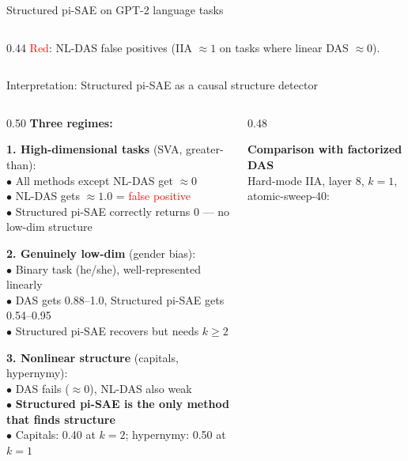 \documentclass[aspectratio=169,11pt]{beamer}
\begin{document}
\begin{frame}{Structured pi-SAE on GPT-2 language tasks}
\begin{columns}[T]
\begin{column}{0.44\textwidth}
\vspace{0.3em}
{\scriptsize \textcolor{red}{Red}: NL-DAS false positives (IIA $\approx 1$ on tasks where linear DAS $\approx 0$).}
\end{column}
\end{columns}
\end{frame}

\begin{frame}{Interpretation: Structured pi-SAE as a causal structure detector}

\begin{columns}[T]
\begin{column}{0.50\textwidth}
\textbf{Three regimes:}

\vspace{0.3em}
{\small \textbf{1. High-dimensional tasks} (SVA, greater-than):}\\
{\small $\bullet$ All methods except NL-DAS get $\approx 0$\\
$\bullet$ NL-DAS gets $\approx 1.0$ = \textcolor{red}{false positive}\\
$\bullet$ Structured pi-SAE correctly returns 0 --- no low-dim structure}

\vspace{0.3em}
{\small \textbf{2. Genuinely low-dim} (gender bias):}\\
{\small $\bullet$ Binary task (he/she), well-represented linearly\\
$\bullet$ DAS gets 0.88--1.0, Structured pi-SAE gets 0.54--0.95\\
$\bullet$ Structured pi-SAE recovers but needs $k \geq 2$}

\vspace{0.3em}
{\small \textbf{3. Nonlinear structure} (capitals, hypernymy):}\\
{\small $\bullet$ DAS fails ($\approx 0$), NL-DAS also weak\\
$\bullet$ \textbf{Structured pi-SAE is the only method that finds structure}\\
$\bullet$ Capitals: 0.40 at $k{=}2$; hypernymy: 0.50 at $k{=}1$}
\end{column}
\begin{column}{0.48\textwidth}

\vspace{0.5em}
\textbf{Comparison with factorized DAS}\\[0.3em]
{\scriptsize Hard-mode IIA, layer 8, $k{=}1$, atomic-sweep-40:}


\end{column}
\end{columns}
\end{frame}
\end{document}
